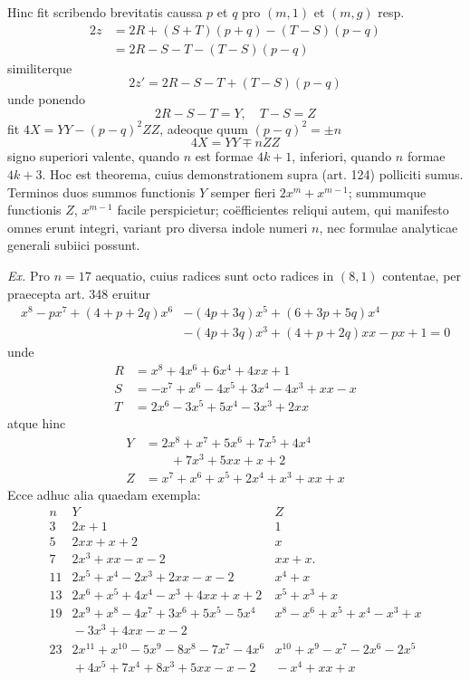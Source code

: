 Hinc fit scribendo brevitatis caussa \(p\) et \(q\) pro \((m,1)\) et \((m,g)\) resp. \[\begin{aligned}2z&=2R+(S+T)(p+q)-(T-S)(p-q)\\&=2R-S-T-(T-S)(p-q)\end{aligned}\] similiterque \[2z'=2R-S-T+(T-S)(p-q)\] unde ponendo \[2R-S-T=Y,\quad T-S=Z\]
fit \(4X=YY-(p-q)^2ZZ\), adeoque quum \((p-q)^2=\pm n\) \[4X=YY\mp nZZ\] signo superiori valente, quando \(n\) est formae \(4k+1\), inferiori, quando \(n\) formae \(4k+3\). Hoc est theorema, cuius demonstrationem supra (art. 124) polliciti sumus. Terminos duos summos functionis \(Y\) semper fieri \(2x^m+x^{m-1}\); summumque functionis \(Z\), \(x^{m-1}\) facile perspicietur; coëfficientes reliqui autem, qui manifesto omnes erunt integri, variant pro diversa indole numeri \(n\), nec formulae analyticae generali subiici possunt.

\textit{Ex.} Pro \(n=17\) aequatio, cuius radices sunt octo radices in \((8,1)\) contentae, per praecepta art. 348 eruitur \[\begin{aligned}x^8-px^7+(4+p+2q)x^6&-(4p+3q)x^5+(6+3p+5q)x^4\\&-(4p+3q)x^3+(4+p+2q)xx-px+1=0\end{aligned}\] unde \[\begin{aligned}R&=x^8+4x^6+6x^4+4xx+1\\S&=-x^7+x^6-4x^5+3x^4-4x^3+xx-x\\T&=2x^6-3x^5+5x^4-3x^3+2xx\end{aligned}\] atque hinc \[\begin{aligned}Y&=2x^8+x^7+5x^6+7x^5+4x^4\\&\qquad+7x^3+5xx+x+2\\Z&=x^7+x^6+x^5+2x^4+x^3+xx+x\end{aligned}\] Ecce adhuc alia quaedam exempla: {\small\setlength{\arraycolsep}{4pt}\[\begin{array}{c|l|l}n&Y&Z\\\hline 3&2x+1&1\\5&2xx+x+2&x\\7&2x^3+xx-x-2&xx+x.\\11&2x^5+x^4-2x^3+2xx-x-2&x^4+x\\13&2x^6+x^5+4x^4-x^3+4xx+x+2&x^5+x^3+x\\19&2x^9+x^8-4x^7+3x^6+5x^5-5x^4&x^8-x^6+x^5+x^4-x^3+x\\{}&{}-3x^3+4xx-x-2&{}\\23&2x^{11}+x^{10}-5x^9-8x^8-7x^7-4x^6&x^{10}+x^9-x^7-2x^6-2x^5\\{}&{}+4x^5+7x^4+8x^3+5xx-x-2&{}-x^4+xx+x\end{array}\]}

